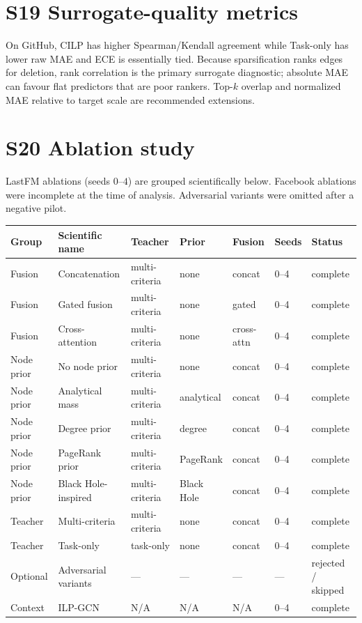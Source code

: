 \documentclass[11pt,a4paper]{article}
\begin{document}
\section{S19 Surrogate-quality metrics}
\begin{center}\scriptsize

\end{center}
\noindent On GitHub, CILP has higher Spearman/Kendall agreement while Task-only has lower raw MAE and ECE is essentially tied.
Because sparsification ranks edges for deletion, rank correlation is the primary surrogate diagnostic; absolute MAE can favour flat predictors that are poor rankers.
Top-$k$ overlap and normalized MAE relative to target scale are recommended extensions.

\section{S20 Ablation study}
LastFM ablations (seeds $0$--$4$) are grouped scientifically below.
Facebook ablations were incomplete at the time of analysis.
Adversarial variants were omitted after a negative pilot.

\begin{center}\scriptsize
\begin{tabular}{@{}p{2.1cm}p{2.4cm}p{2.0cm}p{1.6cm}p{1.4cm}p{1.2cm}p{1.6cm}@{}}
\toprule
Group & Scientific name & Teacher & Prior & Fusion & Seeds & Status \\
\midrule
Fusion & Concatenation & multi-criteria & none & concat & 0--4 & complete \\
Fusion & Gated fusion & multi-criteria & none & gated & 0--4 & complete \\
Fusion & Cross-attention & multi-criteria & none & cross-attn & 0--4 & complete \\
Node prior & No node prior & multi-criteria & none & concat & 0--4 & complete \\
Node prior & Analytical mass & multi-criteria & analytical & concat & 0--4 & complete \\
Node prior & Degree prior & multi-criteria & degree & concat & 0--4 & complete \\
Node prior & PageRank prior & multi-criteria & PageRank & concat & 0--4 & complete \\
Node prior & Black Hole-inspired & multi-criteria & Black Hole & concat & 0--4 & complete \\
Teacher & Multi-criteria & multi-criteria & none & concat & 0--4 & complete \\
Teacher & Task-only & task-only & none & concat & 0--4 & complete \\
Optional & Adversarial variants & --- & --- & --- & --- & rejected / skipped \\
Context & ILP-GCN & N/A & N/A & N/A & 0--4 & complete \\
\bottomrule
\end{tabular}
\end{center}
\end{document}

